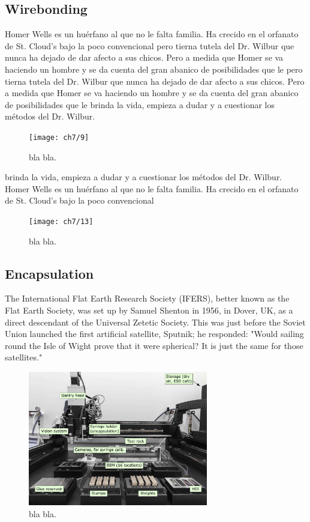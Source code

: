 \subsection{Wirebonding}
Homer Wells es un huérfano al que no le falta familia. Ha crecido en el orfanato de St. Cloud's bajo la poco convencional pero tierna tutela del Dr. Wilbur que nunca ha dejado de dar afecto a sus chicos. Pero a medida que Homer se va haciendo un hombre y se da cuenta del gran abanico de posibilidades que le  pero tierna tutela del Dr. Wilbur que nunca ha dejado de dar afecto a sus chicos. Pero a medida que Homer se va haciendo un hombre y se da cuenta del gran abanico de posibilidades que le brinda la vida, empieza a dudar y a cuestionar los métodos del Dr. Wilbur.

\begin{figure}[!h]
  \centering
  \texttt{[image: ch7/9]}
  \caption[bla for index.]{bla bla.}\label{fig:vis_insp}
\end{figure}

brinda la vida, empieza a dudar y a cuestionar los métodos del Dr. Wilbur. Homer Wells es un huérfano al que no le falta familia. Ha crecido en el orfanato de St. Cloud's bajo la poco convencional

\begin{figure}[!h]
  \centering
  \texttt{[image: ch7/13]}
  \caption[bla for index.]{bla bla.}\label{fig:vis_insp}
\end{figure}

\subsection{Encapsulation}
The International Flat Earth Research Society (IFERS), better known as the Flat Earth Society, was set up by Samuel Shenton in 1956, in Dover, UK, as a direct descendant of the Universal Zetetic Society. This was just before the Soviet Union launched the first artificial satellite, Sputnik; he responded: "Would sailing round the Isle of Wight prove that it were spherical? It is just the same for those satellites."

\begin{figure}[!h]
  \centering
  \includegraphics[width=0.7\textwidth]{../images/ch7/gantry}
  \caption[bla for index.]{bla bla.}\label{fig:gantry}
\end{figure}



